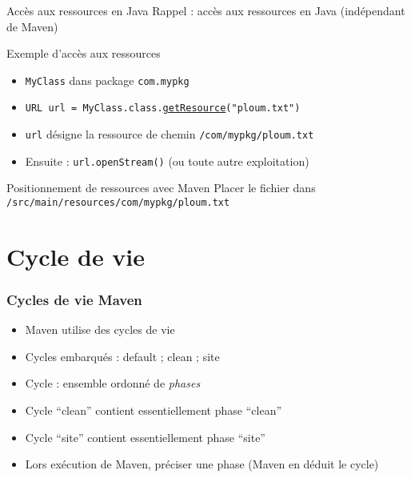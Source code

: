 \documentclass[english, french]{beamer}
\begin{document}
\begin{frame}{Accès aux ressources en Java}
	Rappel : accès aux ressources en Java (indépendant de Maven)
	\begin{exampleblock}{Exemple d’accès aux ressources}
		\begin{itemize}
			\item \texttt{MyClass} dans package \texttt{com.mypkg}
			\item \texttt{URL url = MyClass.class.\href{https://docs.oracle.com/javase/8/docs/api/java/lang/Class.html\#getResource-java.lang.String-}{getResource}("ploum.txt")}
			\item \texttt{url} désigne la ressource de chemin \texttt{/com/mypkg/ploum.txt}
			\item Ensuite : \texttt{url.openStream()} (ou toute autre exploitation)
		\end{itemize}
	\end{exampleblock}
	\begin{block}{Positionnement de ressources avec Maven}
		Placer le fichier dans \texttt{/src/main/resources/com/mypkg/ploum.txt}
	\end{block}
\end{frame}

\section{Cycle de vie}
\begin{frame}
	\frametitle{Cycles de vie Maven}
	\begin{itemize}
		\item Maven utilise des cycles de vie
		\item Cycles embarqués : default ; clean ; site
		\item Cycle : ensemble ordonné de \emph{phases}
		\item Cycle “clean” contient {\tiny essentiellement} phase “clean”
		\item Cycle “site” contient {\tiny essentiellement} phase “site”
		\item Lors exécution de Maven, préciser une phase (Maven en déduit le cycle)
	\end{itemize}
\end{frame}
\end{document}
